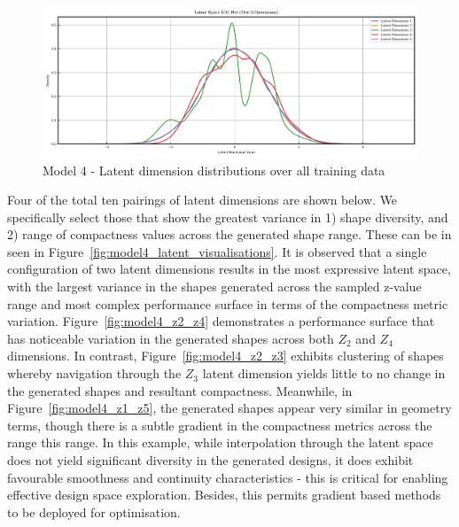 \documentclass{article}
\begin{document}
\begin{figure}[H]
    \centering
    \includegraphics[width=0.75\linewidth]{figures/VAEmodels/model4/latent_distribution.png}
    \caption{Model 4 - Latent dimension distributions over all training data}
    \label{fig:model4_latent_dist}
\end{figure}

Four of the total ten pairings of latent dimensions are shown below. We specifically select those that show the greatest variance in 1) shape diversity, and 2) range of compactness values across the generated shape range. These can be in seen in Figure~\ref{fig:model4_latent_visualisations}. It is observed that a single configuration of two latent dimensions results in the most expressive latent space, with the largest variance in the shapes generated across the sampled z-value range and most complex performance surface in terms of the compactness metric variation. Figure~\ref{fig:model4_z2_z4} demonstrates a performance surface that has noticeable variation in the generated shapes across both $Z_2$ and $Z_4$ dimensions. In contrast, Figure~\ref{fig:model4_z2_z3} exhibits clustering of shapes whereby navigation through the $Z_3$ latent dimension yields little to no change in the generated shapes and resultant compactness. Meanwhile, in Figure~\ref{fig:model4_z1_z5}, the generated shapes appear very similar in geometry terms, though there is a subtle gradient in the compactness metrics across the range this range. In this example, while interpolation through the latent space does not yield significant diversity in the generated designs, it does exhibit favourable smoothness and continuity characteristics - this is critical for enabling effective design space exploration. Besides, this permits gradient based methods to be deployed for optimisation. 
\end{document}
